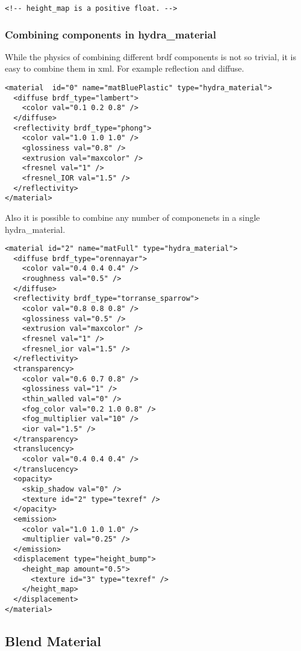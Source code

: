 \documentclass[a4paper,11pt]{report}
\begin{document}
\lstset{language=XML}
\begin{lstlisting}
<!-- height_map is a positive float. -->
\end{lstlisting}


\subsubsection{Combining components in hydra\_material}

While the physics of combining different brdf components is not so trivial, it is easy to combine them in xml. For example reflection and diffuse.

\lstset{language=XML}
\begin{lstlisting}
<material  id="0" name="matBluePlastic" type="hydra_material">
  <diffuse brdf_type="lambert">
    <color val="0.1 0.2 0.8" />
  </diffuse>
  <reflectivity brdf_type="phong">
    <color val="1.0 1.0 1.0" />
    <glossiness val="0.8" />
    <extrusion val="maxcolor" />
    <fresnel val="1" />
    <fresnel_IOR val="1.5" />
  </reflectivity>
</material>
\end{lstlisting}

Also it is possible to combine any number of componenets in a single hydra\_material.

\lstset{language=XML}
\begin{lstlisting}
<material id="2" name="matFull" type="hydra_material">
  <diffuse brdf_type="orennayar">
    <color val="0.4 0.4 0.4" />
    <roughness val="0.5" />
  </diffuse>
  <reflectivity brdf_type="torranse_sparrow">
    <color val="0.8 0.8 0.8" />
    <glossiness val="0.5" />
    <extrusion val="maxcolor" />
    <fresnel val="1" />
    <fresnel_ior val="1.5" />
  </reflectivity>
  <transparency>
    <color val="0.6 0.7 0.8" />
    <glossiness val="1" />
    <thin_walled val="0" />
    <fog_color val="0.2 1.0 0.8" />
    <fog_multiplier val="10" />
    <ior val="1.5" />
  </transparency>  
  <translucency>
    <color val="0.4 0.4 0.4" />
  </translucency>
  <opacity>
    <skip_shadow val="0" />
    <texture id="2" type="texref" />
  </opacity>
  <emission>
    <color val="1.0 1.0 1.0" />
    <multiplier val="0.25" />
  </emission>
  <displacement type="height_bump">
    <height_map amount="0.5">
      <texture id="3" type="texref" />
    </height_map>
  </displacement>  
</material>

\end{lstlisting}

\subsection{Blend Material}
\end{document}
